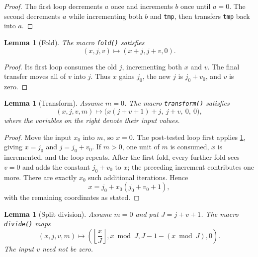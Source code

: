 \documentclass[10pt]{article}
\newtheorem{lemma}[theorem]{Lemma}
\theoremstyle{definition}
\begin{document}
\begin{proof}
The first loop decrements $a$ once and increments $b$ once until $a=0$. The
second decrements $a$ while incrementing both $b$ and \texttt{tmp}, then
transfers \texttt{tmp} back into $a$.
\end{proof}

\begin{lemma}[Fold]
\label{lem:fold}
The macro \texttt{fold()} satisfies
\begin{equation}
\label{eq:fold}
(x,j,v)\longmapsto(x+j,j+v,0).
\end{equation}
\end{lemma}

\begin{proof}
Its first loop consumes the old $j$, incrementing both $x$ and $v$. The final
transfer moves all of $v$ into $j$. Thus $x$ gains $j_0$, the new $j$ is
$j_0+v_0$, and $v$ is zero.
\end{proof}

\begin{lemma}[Transform]
\label{lem:transform}
Assume $m=0$. The macro \texttt{transform()} satisfies
\begin{equation}
\label{eq:transform}
(x,j,v,m)\longmapsto
\bigl(x(j+v+1)+j,\ j+v,\ 0,\ 0\bigr),
\end{equation}
where the variables on the right denote their input values.
\end{lemma}

\begin{proof}
Move the input $x_0$ into $m$, so $x=0$. The post-tested loop first applies
\cref{lem:fold}, giving $x=j_0$ and $j=j_0+v_0$. If $m>0$, one unit of $m$ is
consumed, $x$ is incremented, and the loop repeats. After the first fold,
every further fold sees $v=0$ and adds the constant $j_0+v_0$ to $x$; the
preceding increment contributes one more. There are exactly $x_0$ such
additional iterations. Hence
\[
x=j_0+x_0(j_0+v_0+1),
\]
with the remaining coordinates as stated.
\end{proof}

\begin{lemma}[Split division]
\label{lem:divide}
Assume $m=0$ and put $J=j+v+1$. The macro \texttt{divide()} maps
\begin{equation}
\label{eq:divide}
(x,j,v,m)\longmapsto
\left(\left\lfloor\frac{x}{J}\right\rfloor,
 x\bmod J,
 J-1-(x\bmod J),0\right).
\end{equation}
The input $v$ need not be zero.
\end{lemma}
\end{document}
